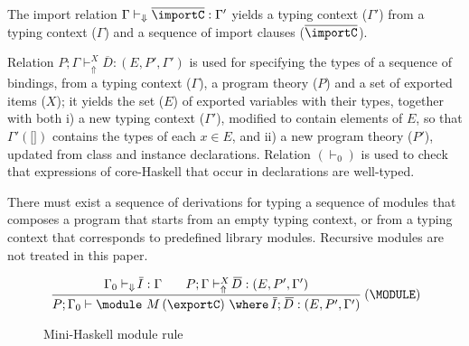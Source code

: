 The import relation $\Gamma \vdash_{\Downarrow} \overline{\importC} :  \Gamma'$ yields a typing context ($\Gamma'$) from a typing
context ($\Gamma$) and a sequence of import clauses
($\overline{\importC}$). 

Relation $P;\Gamma \vdash_{\Uparrow}^X \overline{\!D}:(E,P',\Gamma')$
is used for specifying the types of a sequence of bindings, from a
typing context ($\Gamma$), a program theory ($P$) and a set of
exported items ($X$); it yields the set ($E$) of exported variables
with their types, together with both i) a new typing context
($\Gamma'$), modified to contain elements of $E$, so that
$\Gamma'(\texttt{[]})$ contains the types of each $x\in E$, and ii) a
new program theory ($P'$), updated from class and instance
declarations. Relation $(\vdash_0)$ is used to check that expressions
of core-Haskell that occur in declarations are well-typed.


There must exist a sequence of derivations for typing a sequence of
modules that composes a program that starts from an empty typing
context, or from a typing context that corresponds to predefined
library modules. Recursive modules are not treated in this paper.




\begin{figure}
\begin{mdframed}
\[ \begin{array}{cc}
	\displaystyle\frac
	 {\begin{array}{ll}
           \Gamma_0 \vdash_{\Downarrow} \overline{\!I} : \Gamma\:\: & \:\:P;\Gamma \vdash_{\Uparrow}^X \overline{\!D} : (E,P',\Gamma') 
          \end{array}}
	 {P;\Gamma_0 \vdash \module\ M\, (\exportC)\ \where\ \overline{\!I};\, \overline{\!D} : (E,P',\Gamma')} \:(\MODULE)
\end{array} \]
\end{mdframed} \vspace{-.2cm}
\caption{Mini-Haskell module rule} 
\label{fig:mini-haskell-module-rule}
\end{figure}

